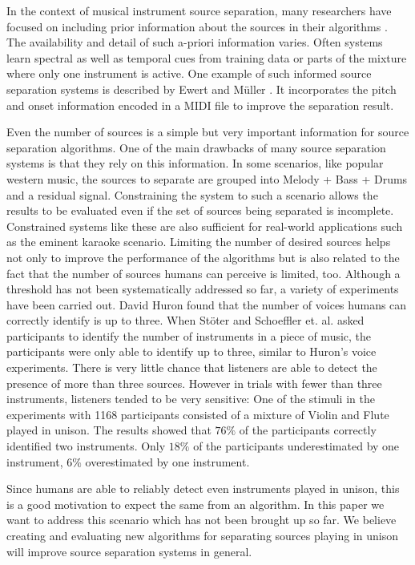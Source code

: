 In the context of musical instrument source separation, many researchers have focused on including prior information about the sources in their algorithms \cite{ozerov2012general}. The availability and detail of such a-priori information varies. Often systems learn spectral as well as temporal cues from training data or parts of the mixture where only one instrument is active. One example of such informed source separation systems is described by Ewert and M\"uller \cite{ewert2012using}. It incorporates the pitch and onset information encoded in a MIDI file to improve the separation result.

Even the number of sources is a simple but very important information for source separation algorithms. One of the main drawbacks of many source separation systems is that they rely on this information. In some scenarios, like popular western music, the sources to separate are grouped into Melody + Bass + Drums and a residual signal. Constraining the system to such a scenario allows the results to be evaluated even if the set of sources being separated is incomplete. Constrained systems like these are also sufficient for real-world applications such as the eminent karaoke scenario. Limiting the number of desired sources helps not only to improve the performance of the algorithms but is also related to the fact that the number of sources humans can perceive is limited, too. Although a threshold has not been systematically addressed so far, a variety of experiments have been carried out. David Huron found \cite{huron89} that the number of voices humans can correctly identify is up to three. When St\"oter and Schoeffler et. al. \cite{stoter2013human, schoeffler2013experiment} asked participants to identify the number of instruments in a piece of music, the participants were only able to identify up to three, similar to Huron's voice experiments. There is very little chance that listeners are able to detect the presence of more than three sources. However in trials with fewer than three instruments, listeners tended to be very sensitive: One of the stimuli in the \cite{stoter2013human, schoeffler2013experiment} experiments with 1168 participants consisted of a mixture of Violin and Flute played in unison. The results showed that $76\%$ of the participants correctly identified two instruments. Only $18\%$ of the participants underestimated by one instrument, $6\%$ overestimated by one instrument.

Since humans are able to reliably detect even instruments played in unison,  this is a good motivation to expect the same from an algorithm. In this paper we want to address this scenario which has not been brought up so far. We believe creating and evaluating new algorithms for separating sources playing in unison will improve source separation systems in general.

